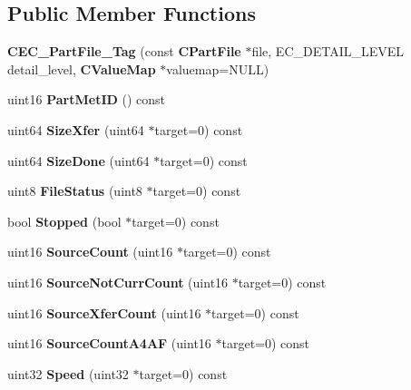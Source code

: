 \subsection*{Public Member Functions}
\begin{DoxyCompactItemize}
\item 
{\bfseries CEC\_\-PartFile\_\-Tag} (const {\bf CPartFile} $\ast$file, EC\_\-DETAIL\_\-LEVEL detail\_\-level, {\bf CValueMap} $\ast$valuemap=NULL)\label{classCEC__PartFile__Tag_a831c762bcee28dff9baf5067338db861}

\item 
uint16 {\bfseries PartMetID} () const \label{classCEC__PartFile__Tag_a3eb8a32a5a346308a3bed29841578d42}

\item 
uint64 {\bfseries SizeXfer} (uint64 $\ast$target=0) const \label{classCEC__PartFile__Tag_a62d99a536d299ccd93293518ad95739a}

\item 
uint64 {\bfseries SizeDone} (uint64 $\ast$target=0) const \label{classCEC__PartFile__Tag_adaa1f6913e6ff1b4bb12e280b6d29c11}

\item 
uint8 {\bfseries FileStatus} (uint8 $\ast$target=0) const \label{classCEC__PartFile__Tag_a8ff59fbc9e9505f1046f207a142a1470}

\item 
bool {\bfseries Stopped} (bool $\ast$target=0) const \label{classCEC__PartFile__Tag_a59c9a0cdaf99f25092e6d3808c7f21d5}

\item 
uint16 {\bfseries SourceCount} (uint16 $\ast$target=0) const \label{classCEC__PartFile__Tag_ad0e83f6673a2c062c82c72b552d2ab26}

\item 
uint16 {\bfseries SourceNotCurrCount} (uint16 $\ast$target=0) const \label{classCEC__PartFile__Tag_ac410a0285b4c4b547f6ceec47475272b}

\item 
uint16 {\bfseries SourceXferCount} (uint16 $\ast$target=0) const \label{classCEC__PartFile__Tag_a92b9c56fc043ac2cdda8eff69332e076}

\item 
uint16 {\bfseries SourceCountA4AF} (uint16 $\ast$target=0) const \label{classCEC__PartFile__Tag_a135ab059ba073f4108a2fe68df56ac51}

\item 
uint32 {\bfseries Speed} (uint32 $\ast$target=0) const \label{classCEC__PartFile__Tag_a9aea1518f1055bcfa82cb2326eb76e09}


\end{DoxyCompactItemize}
